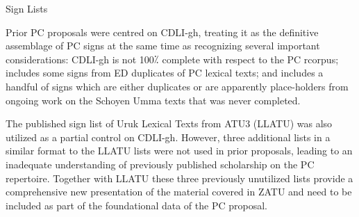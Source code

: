 	\centerline{\vbox{\offinterlineskip{}
}}\Hh{}Sign Lists


\par Prior PC proposals were centred on CDLI-gh, treating it as
      the definitive assemblage of PC signs at the same time as
      recognizing several important considerations: CDLI-gh is not
      100⁒ complete with respect to the PC rcorpus; includes some
      signs from ED duplicates of PC lexical texts; and includes a
      handful of signs which are either duplicates or are apparently
      place-holders from ongoing work on the Schoyen Umma texts that
      was never completed.


\par The published sign list of Uruk Lexical Texts from ATU3
      (LLATU) was also utilized as a partial control on
      CDLI-gh. However, three additional lists in a similar format to
      the LLATU lists were not used in prior proposals, leading to an
      inadequate understanding of previously published scholarship on
      the PC repertoire.  Together with LLATU these three previously
      unutilized lists provide a comprehensive new presentation of the
      material covered in ZATU and need to be included as part of the
      foundational data of the PC proposal.


